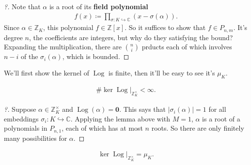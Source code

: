 \begin{proof}[?]

Note that \(\alpha\) is a root of its \textbf{field polynomial}
\begin{align*}
f(x) \coloneqq\prod_{\sigma: K \hookrightarrow{\mathbb{C}}} (x - \sigma( \alpha))
.\end{align*}
Since \(\alpha \in {\mathbb{Z}}_K\), this polynomial
\(f \in {\mathbb{Z}}[x]\). So it suffices to show that
\(f\in P_{n, m}\). It's degree \(n\), the coefficients are integers, but
why do they satisfying the bound? Expanding the multiplication, there
are \({n\choose i}\) prducts each of which involves \(n-i\) of the
\(\sigma_i( \alpha)\), which is bounded.

\end{proof}

\begin{remark}

We'll first show the kernel of \(\operatorname{Log}\) is finite, then
it'll be easy to see it's \(\mu_K\).

\end{remark}

\begin{proposition}[?]

\begin{align*}
\# \ker { \left.{{ \operatorname{Log}}} \right|_{{{\mathbb{Z}}_K^{\times}}} } < \infty 
.\end{align*}

\end{proposition}

\begin{proof}[?]

Suppose \(\alpha\in {\mathbb{Z}}_K^{\times}\) and
\(\operatorname{Log}(\alpha) = \mathbf{0}\). This says that
\({\left\lvert { \sigma_i( \alpha)} \right\rvert} = 1\) for all
embeddings \(\sigma_i: K\hookrightarrow{\mathbb{C}}\). Applying the
lemma above with \(M=1\), \(\alpha\) is a root of a polynomials in
\(P_{n, 1}\), each of which has at most \(n\) roots. So there are only
finitely many possibilities for \(\alpha\).

\end{proof}

\begin{proposition}[?]

\begin{align*}
\ker { \left.{{ \operatorname{Log}}} \right|_{{{\mathbb{Z}}_K^{\times}}} } = \mu_K
.\end{align*}

\end{proposition}

